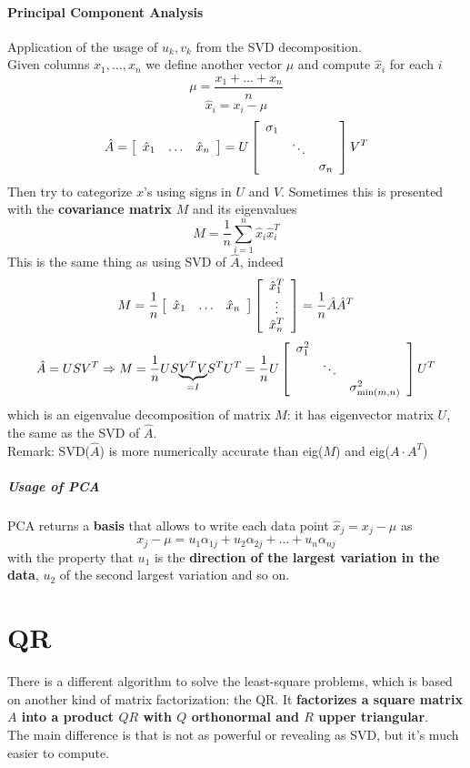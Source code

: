 \documentclass[10pt]{report}
\begin{document}
\paragraph{Principal Component Analysis} Application of the usage of $u_k, v_k$ from the SVD decomposition.\\
Given columns $x_1,\ldots,x_n$ we define another vector $\mu$ and compute $\hat{x}_i$ for each $i$
$$\mu = \frac{x_1+\ldots+x_n}{n}$$
$$\hat{x}_{i} = x_i - \mu$$
$$\hat{A} = \left[\begin{array}{c c c}
\hat{x}_1&\ldots&\hat{x}_n
\end{array}\right] = U\left[\begin{array}{c c c}
\sigma_1\\
&\ddots\\
&&\sigma_n
\end{array}\right]V^T$$
Then try to categorize $x$'s using signs in $U$ and $V$. Sometimes this is presented with the \textbf{covariance matrix} $M$ and its eigenvalues
$$M=\frac{1}{n}\sum_{i=1}^n \hat{x}_i\hat{x}_i^T$$
This is the same thing as using SVD of $\hat{A}$, indeed
$$M=\frac{1}{n}\left[\begin{array}{c c c}
\hat{x}_1&\ldots&\hat{x}_n
\end{array}\right]\left[\begin{array}{c}
\hat{x}_1^T\\\vdots\\\hat{x}_n^T
\end{array}\right]=\frac{1}{n}\hat{A}\hat{A}^T$$
$$\hat{A} = USV^T \Rightarrow M = \frac{1}{n}US\underset{=I}{\underbrace{V^TV}}S^TU^T = \frac{1}{n}U\left[\begin{array}{c c c}
\sigma_1^2\\
&\ddots\\
&&\sigma_{\min(m,n)}^2
\end{array}\right]U^T$$
which is an eigenvalue decomposition of matrix $M$: it has eigenvector matrix $U$, the same as the SVD of $\hat{A}$.\\
Remark: SVD($\hat{A}$) is more numerically accurate than eig($M$) and eig($A\cdot A^T$)
\subparagraph{Usage of PCA} PCA returns a \textbf{basis} that allows to write each data point $\hat{x}_j = x_j - \mu$ as
$$x_j - \mu = u_1 \alpha_{1j} + u_2\alpha_{2j} + \ldots + u_n\alpha_{nj}$$
with the property that $u_1$ is the \textbf{direction of the largest variation in the data}, $u_2$ of the second largest variation and so on.
\section{QR}
There is a different algorithm to solve the least-square problems, which is based on another kind of matrix factorization: the QR. It \textbf{factorizes a square matrix $A$ into a product $QR$ with $Q$ orthonormal and $R$ upper triangular}.\\
The main difference is that is not as powerful or revealing as SVD, but it's much easier to compute.
\end{document}
